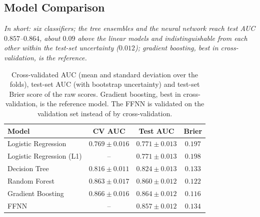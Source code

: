 \subsection{Model Comparison}
\label{sec:ml_models}
\emph{In short: six classifiers; the tree ensembles and the neural network reach test AUC $0.857$--$0.864$, about $0.09$ above the linear models and indistinguishable from each other within the test-set uncertainty ($0.012$); gradient boosting, best in cross-validation, is the reference.}
\begin{table}[h]
\centering
\begin{tabular}{lccc}
\toprule
Model & CV AUC & Test AUC & Brier \\
\midrule
Logistic Regression       & $0.769 \pm 0.016$ & $0.771 \pm 0.013$ & $0.197$ \\
Logistic Regression (L1)  & --                & $0.771 \pm 0.013$ & $0.198$ \\
Decision Tree             & $0.816 \pm 0.011$ & $0.824 \pm 0.013$ & $0.133$ \\
Random Forest             & $0.863 \pm 0.017$ & $0.860 \pm 0.012$ & $0.122$ \\
Gradient Boosting         & $\mathbf{0.866 \pm 0.016}$ & $0.864 \pm 0.012$ & $0.116$ \\
FFNN                      & --                & $0.857 \pm 0.012$ & $0.134$ \\
\bottomrule
\end{tabular}
\caption{Cross-validated AUC (mean and standard deviation over the folds), test-set AUC (with bootstrap uncertainty) and test-set Brier score of the raw scores. Gradient boosting, best in cross-validation, is the reference model. The FFNN is validated on the validation set instead of by cross-validation.}
\label{tab:ml_models}
\end{table}

